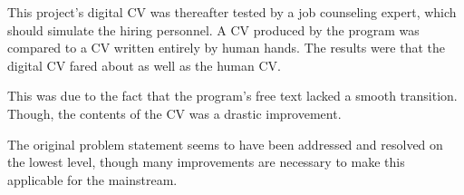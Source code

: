This project’s digital CV was thereafter tested by a job counseling expert, which should simulate the hiring personnel. 
A CV produced by the program was compared to a CV written entirely by human hands.
The results were that the digital CV fared about as well as the human CV.

This was due to the fact that the program’s free text lacked a smooth transition. Though, the contents of the CV was a drastic improvement.

The original problem statement seems to have been addressed and resolved on the lowest level, though many improvements are necessary to make this applicable for the mainstream.
\clearpage